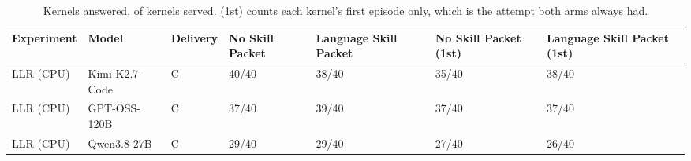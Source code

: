 \begin{table}[t]
  \centering
  \caption{Kernels answered, of kernels served. (1st) counts each kernel's first episode only, which is the attempt both arms always had.}
  \label{tab:solve-rate}
  \begin{tabular}{lllllll}
    \toprule
    Experiment & Model & Delivery & No Skill Packet & Language Skill Packet & No Skill Packet (1st) & Language Skill Packet (1st) \\
    \midrule
    LLR (CPU) & Kimi-K2.7-Code & C & 40/40 & 38/40 & 35/40 & 38/40 \\
    LLR (CPU) & GPT-OSS-120B & C & 37/40 & 39/40 & 37/40 & 37/40 \\
    LLR (CPU) & Qwen3.8-27B & C & 29/40 & 29/40 & 27/40 & 26/40 \\
    \bottomrule
  \end{tabular}
\end{table}
